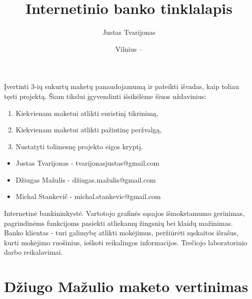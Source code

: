 \documentclass[oneside]{VUMIFPSkursinis}
\title{Internetinio banko tinklalapis}
\author{Justas Tvarijonas}
\date{Vilnius – \the\year}
\begin{document}
\maketitle
{}
Įvertinti 3-ių sukurtų maketų panaudojamumą ir pateikti išvadas, kaip toliau tęsti projektą. Šiam tikslui įgyvendinti išsikėlėme šiuos uždavinius:
\begin{enumerate}
	\item Kiekvienam maketui atlikti euristinį tikrinimą,
	\item Kiekvienam maketui atlikti pažintinę peržvalgą,
	\item Nustatyti tolimesnę projekto eigos kryptį.
\end{enumerate}
\begin{itemize}
	\item Justas Tvarijonas - tvarijonasjustas@gmail.com
	\item Džiugas Mažulis - džiugas.mažulis@gmail.com
	\item Michal Stankevič - michal.stankevic@gmail.com 
\end{itemize}
\tableofcontents
{}
Internetinė bankininkystė.
Vartotojo grafinės sąsajos išmokstamumo gerinimas, pagrindinėms funkcijoms pasiekti atliekamų žingsnių bei klaidų mažinimas.
Banko klientas - turi galimybę atlikti mokėjimus, peržiūrėti sąskaitos išrašus, kurti mokėjimo ruošinius, ieškoti reikalingos informacijos.
Trečiojo laboratorinio darbo reikalavimai.
\section{Džiugo Mažulio maketo vertinimas}
\end{document}
